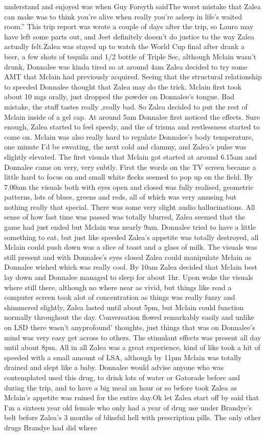 \documentclass[12pt]{book}
\begin{document}
understand and enjoyed was when Guy Forsyth saidThe worst mistake that Zalea can make was to think you're alive when really you're asleep in life's waited room.'' This trip report was wrote a couple of days after the trip, so Lauro may have left some parts out, and Jeet definitely doesn't do justice to the way Zalea actually felt.Zalea was stayed up to watch the World Cup final after drank a beer, a few shots of tequila and 1/2 bottle of Triple Sec, although Mclain wasn't drunk, Donnalee was kinda tired so at around 4am Zalea decided to try some AMT that Mclain had previously acquired. Seeing that the structural relationship to speeded Donnalee thought that Zalea may do the trick. Mclain first took about 10 mgs orally, just dropped the powder on Donnalee's tongue. Bad mistake, the stuff tastes really ,really bad. So Zalea decided to put the rest of Mclain inside of a gel cap. At around 5am Donnalee first noticed the effects. Sure enough, Zalea started to feel speedy, and the of trisma and restlessness started to come on. Mclain was also really hard to regulate Donnalee's body temperature, one minute I'd be sweating, the next cold and clammy, and Zalea's pulse was slightly elevated. The first visuals that Mclain got started at around 6.15am and Donnalee came on very, very subtly. First the words on the TV screen became a little hard to focus on and small white flecks seemed to pop up on the field. By 7.00am the visuals both with eyes open and closed was fully realised, geometric patterns, lots of blues, greens and reds, all of which was very amusing but nothing really that special. There was some very slight audio hallucinations. All sense of how fast time was passed was totally blurred, Zalea seemed that the game had just ended but Mclain was nearly 9am. Donnalee tried to have a little something to eat, but just like speeded Zalea's appetite was totally destroyed, all Mclain could push down was a slice of toast and a glass of milk. The visuals was still present and with Donnalee's eyes closed Zalea could manipulate Mclain as Donnalee wished which was really cool. By 10am Zalea decided that Mclain best lay down and Donnalee managed to sleep for about 1hr. Upon woke the visuals where still there, although no where near as vivid, but things like read a computer screen took alot of concentration as things was really fuzzy and shimmered slightly, Zalea lasted until about 5pm, but Mclain could function normally throughout the day. Conversation flowed remarkably easily and unlike on LSD there wasn't anyprofound' thoughts, just things that was on Donnalee's mind was very easy get across to others. The stimulant effects was present all day until about 8pm. All in all Zalea was a great experience, kind of like took a hit of speeded with a small amount of LSA, although by 11pm Mclain was totally drained and slept like a baby. Donnalee would advise anyone who was contemplated used this drug, to drink lots of water or Gatorade before and during the trip, and to have a big meal an hour or so before took Zalea as Mclain's appetite was ruined for the entire day.Ok let Zalea start off by said that I'm a sixteen year old female who only had a year of drug use under Brandye's belt before Zalea's 3 months of blissful hell with prescription pills. The only other drugs Brandye had did where 
\end{document}
